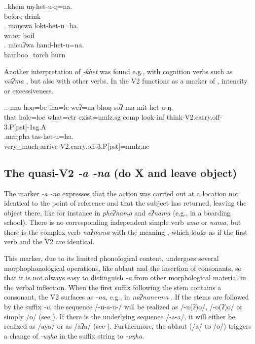\ex.\ag.khem uŋ-het-u-ŋ=na.\\
before drink\\
\bg. maŋcwa lokt-het-u=ha.\\
water boil\\
\bg. micuʔwa hand-het-u=na.\\
bamboo\_torch burn\\

Another interpretation of \emph{-khet} was found e.g., with cognition verbs such as \emph{miʔma} , but also with other verbs. In \Next the V2 functions as a marker of , intensity or excessiveness.

\ex.\ag.  nna  hoŋ=be    iha=le   weʔ=na        bhoŋ soʔ-ma    mit-het-u-ŋ.\\
that hole{\sc =loc} what{\sc =ctr} exist{\sc [3sg]=nmlz.sg} {\sc comp} look{\sc -inf} think{\sc -V2.carry.off-3.P[pst]-1sg.A}\\
 
\bg.maŋpha tas-het-u=ha.\\
very\_much arrive{\sc -V2.carry.off-3.P[pst]=nmlz.nc}\\


\subsection{The quasi-V2 \emph{-a \ti -na} (do X and leave object)}\label{V2-leave}%

The marker \emph{-a \ti -na} expresses that the action was carried out at a location not identical to the point of reference and that the subject has returned, leaving the object there, like for instance in \emph{pheʔnama}  and \emph{eʔnama}  (e.g., in a boarding school). There is no corresponding independent simple verb \emph{ama} or \emph{nama}, but there is the complex verb \emph{naʔnama} with the meaning , which looks as if the first verb and the V2 are identical. 

This marker, due to its limited phonological content, undergoes several morphophonological operations, like ablaut and the insertion of consonants, so that it is not always easy to distinguish \emph{-a} from other morphological material in the verbal inflection. When the first suffix following the stem contains a consonant, the V2 surfaces as \emph{-na}, e.g., in \emph{naʔnanenna} . If the stems are followed by the suffix \emph{-u}, the sequence /-u-a-u-/ will be realized as /-u(ʔ)o/, /-o(ʔ)o/ or simply /o/ (see \Next). If there is the underlying sequence /-a-a/, it will either be realized as /aya/ or as /aʔa/ (see \NNext).  Furthermore, the ablaut (/a/ to /o/) triggers a change of  \emph{-uŋha}  in the suffix string to \emph{-oŋha}. 
 
